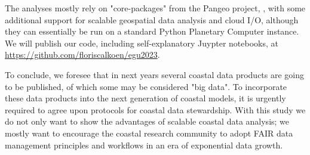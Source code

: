 \documentclass[11pt,twoside,a4paper]{article}
\begin{document}
{  The analyses mostly rely on "core-packages" from the Pangeo project, \parencite{hammanPangeoBigdataEcosystem2018}, with some additional support for scalable geospatial data analysis and cloud I/O, although they can essentially be run on a standard Python Planetary Computer instance.
  We will publish our code, including self-explanatory Juypter notebooks, at
  \url{https://github.com/floriscalkoen/egu2023}. 

  To conclude, we foresee that in next years several coastal data products are going to
  be published, of which some may be considered "big data". To incorporate these data
  products into the next generation of coastal models, it is urgently required to agree
  upon protocols for coastal data stewardship. With this study we do not only want to
  show the advantages of scalable coastal data analysis; we mostly want to encourage the
  coastal research community to adopt FAIR data management principles \parencite{wilkinsonFAIRGuidingPrinciples2016} and workflows in an era of
  exponential data growth.}

\printbibliography
\end{document}
